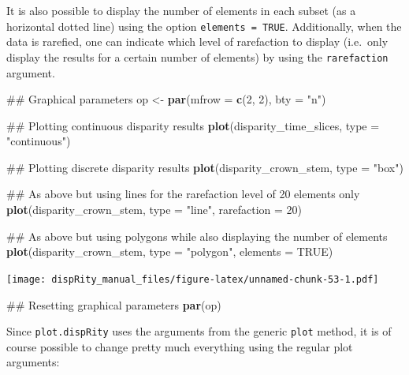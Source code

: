 \documentclass[]{book}
\newenvironment{Shaded}{\begin{snugshade}}{\end{snugshade}}
\newcommand{\KeywordTok}[1]{\textcolor[rgb]{0.13,0.29,0.53}{\textbf{#1}}}
\newcommand{\DataTypeTok}[1]{\textcolor[rgb]{0.13,0.29,0.53}{#1}}
\newcommand{\DecValTok}[1]{\textcolor[rgb]{0.00,0.00,0.81}{#1}}
\newcommand{\StringTok}[1]{\textcolor[rgb]{0.31,0.60,0.02}{#1}}
\newcommand{\OtherTok}[1]{\textcolor[rgb]{0.56,0.35,0.01}{#1}}
\newcommand{\NormalTok}[1]{#1}
\theoremstyle{definition}
\theoremstyle{definition}
\theoremstyle{remark}
\begin{document}
It is also possible to display the number of elements in each subset (as
a horizontal dotted line) using the option \texttt{elements\ =\ TRUE}.
Additionally, when the data is rarefied, one can indicate which level of
rarefaction to display (i.e.~only display the results for a certain
number of elements) by using the \texttt{rarefaction} argument.

\begin{Shaded}
\begin{Highlighting}[]
\NormalTok{## Graphical parameters}
\NormalTok{op <-}\StringTok{ }\KeywordTok{par}\NormalTok{(}\DataTypeTok{mfrow =} \KeywordTok{c}\NormalTok{(}\DecValTok{2}\NormalTok{, }\DecValTok{2}\NormalTok{), }\DataTypeTok{bty =} \StringTok{"n"}\NormalTok{)}

\NormalTok{## Plotting continuous disparity results}
\KeywordTok{plot}\NormalTok{(disparity_time_slices, }\DataTypeTok{type =} \StringTok{"continuous"}\NormalTok{)}

\NormalTok{## Plotting discrete disparity results}
\KeywordTok{plot}\NormalTok{(disparity_crown_stem, }\DataTypeTok{type =} \StringTok{"box"}\NormalTok{)}

\NormalTok{## As above but using lines for the rarefaction level of 20 elements only}
\KeywordTok{plot}\NormalTok{(disparity_crown_stem, }\DataTypeTok{type =} \StringTok{"line"}\NormalTok{, }\DataTypeTok{rarefaction =} \DecValTok{20}\NormalTok{)}

\NormalTok{## As above but using polygons while also displaying the number of elements}
\KeywordTok{plot}\NormalTok{(disparity_crown_stem, }\DataTypeTok{type =} \StringTok{"polygon"}\NormalTok{, }\DataTypeTok{elements =} \OtherTok{TRUE}\NormalTok{)}
\end{Highlighting}
\end{Shaded}

\texttt{[image: dispRity\_manual\_files/figure-latex/unnamed-chunk-53-1.pdf]}

\begin{Shaded}
\begin{Highlighting}[]
\NormalTok{## Resetting graphical parameters}
\KeywordTok{par}\NormalTok{(op)}
\end{Highlighting}
\end{Shaded}

Since \texttt{plot.dispRity} uses the arguments from the generic
\texttt{plot} method, it is of course possible to change pretty much
everything using the regular plot arguments:
\end{document}
